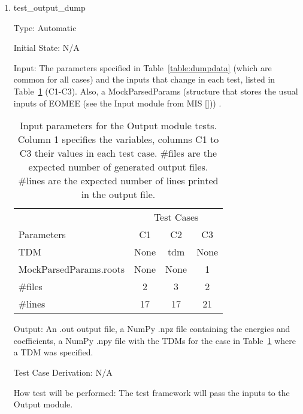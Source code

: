 \documentclass[12pt, titlepage]{article}
\begin{document}
\begin{enumerate}
	
	\item{test\_output\_dump\\}
	
	Type: Automatic
	
	Initial State: N/A
	
	Input: The parameters specified in Table~\ref{table:dumpdata} (which are 
	common for all cases) and the inputs that change in each test, listed in 
	Table~\ref{table:dumpcases} (C1-C3). Also, a MockParsedParams (structure 
	that stores the usual inputs of EOMEE (see the Input module from MIS 
	[\cite{MIS2020}]))  .
	\begin{table}[h!]
		\centering
		\begin{tabular}{lccc}
			                       & \multicolumn{3}{c}{Test Cases} \\
			Parameters             &  C1  &  C2  &        C3        \\
			TDM                    & None & tdm  &       None       \\
			MockParsedParams.roots & None & None &        1         \\
			\#files                &  2   &  3   &        2         \\
			\#lines                &  17  &  17  &        21
		\end{tabular}
		\caption{Input parameters for the Output module tests. Column 1 
		specifies the variables, columns C1 to C3 their values in each test 
		case. \#files are the expected number of generated output files. 
		\#lines are the expected number of lines printed in the output file.}
		\label{table:dumpcases}
	\end{table}
	
	Output: An .out output file, a NumPy .npz file containing the energies and 
	coefficients, a NumPy .npy file with the TDMs for the case in 
	Table~\ref{table:dumpcases} where a TDM was specified.
	
	Test Case Derivation: N/A
	
	How test will be performed: The test framework will pass the inputs to the 
	Output module.
	
\end{enumerate}

%
\end{document}
